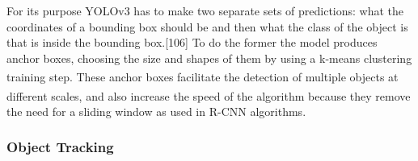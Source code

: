 \documentclass[11pt]{article}		%
\newcommand{\supercite}[1]{\textsuperscript{\cite{#1}}}		%
\begin{document}
			\hspace*{3ex}For its purpose YOLOv3 has to make two separate sets of predictions: what the coordinates of a bounding box should be and then what the class of the object is that is inside the bounding box.[106] To do the former the model produces anchor boxes, choosing the size and shapes of them by using a k-means clustering training step.\supercite{k-means-clustering} These anchor boxes facilitate the detection of multiple objects at different scales,\supercite{YOLOV2} and also increase the speed of the algorithm because they remove the need for a sliding window as used in R-CNN algorithms.
	       
	        \subsubsection{Object Tracking}
	        
\end{document}
